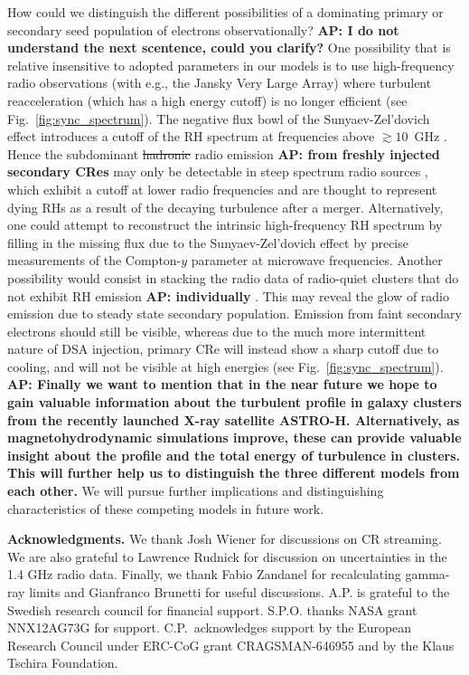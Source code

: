 \documentclass[fleqn,usenatbib,useAMS]{mnras}
\def\AP2#1{{\bf  AP2: #1}}
\def\AP#1{{\bf {\color{blue} AP: #1}}}
\begin{document}
How could we distinguish the different possibilities of a dominating
primary or secondary seed population of electrons observationally?
\AP{I do not understand the next scentence, could you clarify?} One
possibility that is relative insensitive to adopted parameters in our
models is to use high-frequency radio observations (with e.g., the
Jansky Very Large Array) where turbulent reacceleration (which has a
high energy cutoff) is no longer efficient (see
Fig.~\ref{fig:sync_spectrum}). The negative flux bowl of the
Sunyaev-Zel'dovich effect introduces a cutoff of the RH spectrum at
frequencies above $\gtrsim 10$~GHz \citep[][ depending on cluster mass
  and redshift]{2002A&A...396L..17E,Pfrommer:2003mk}. Hence the
subdominant \sout{hadronic} radio emission \AP{from freshly injected
  secondary CRes} may only be detectable in steep spectrum radio
sources \citep{2008Natur.455..944B}, which exhibit a cutoff at lower
radio frequencies and are thought to represent dying RHs as a result
of the decaying turbulence after a merger. Alternatively, one could
attempt to reconstruct the intrinsic high-frequency RH spectrum by
filling in the missing flux due to the Sunyaev-Zel'dovich effect by
precise measurements of the Compton-$y$ parameter at microwave
frequencies. Another possibility would consist in stacking the radio
data of radio-quiet clusters that do not exhibit RH emission
\AP{individually} \citep{2011ApJ...740L..28B}. This may reveal the
glow of radio emission due to steady state secondary
population. Emission from faint secondary electrons should still be
visible, whereas due to the much more intermittent nature of DSA
injection, primary CRe will instead show a sharp cutoff due to
cooling, and will not be visible at high energies (see
Fig.~\ref{fig:sync_spectrum}). \AP{Finally we want to mention that in
  the near future we hope to gain valuable information about the
  turbulent profile in galaxy clusters from the recently launched
  X-ray satellite ASTRO-H. Alternatively, as magnetohydrodynamic
  simulations improve, these can provide valuable insight about the
  profile and the total energy of turbulence in clusters. This will
  further help us to distinguish the three different models from each
  other.} We will pursue further implications and distinguishing
characteristics of these competing models in future work.


{\bf Acknowledgments.} We thank Josh Wiener for discussions on CR
streaming. We are also grateful to Lawrence Rudnick for discussion on
uncertainties in the 1.4 GHz radio data. Finally, we thank Fabio
Zandanel for recalculating gamma-ray limits and Gianfranco Brunetti
for useful discussions. A.P. is grateful to the Swedish research
council for financial support. S.P.O. thanks NASA grant NNX12AG73G for
support. C.P.~acknowledges support by the European Research Council
under ERC-CoG grant CRAGSMAN-646955 and by the Klaus Tschira
Foundation.


\vspace{-0.7cm}



\end{document}
